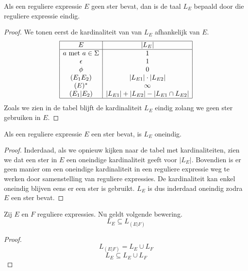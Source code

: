 \documentclass[main.tex]{subfiles}
\begin{document}
\begin{st}
  Als een reguliere expressie $E$ geen ster bevat, dan is de taal $L_{E}$ bepaald door die reguliere expressie eindig.
  
  \begin{proof}
    We tonen eerst de kardinaliteit van van $L_{E}$ afhankelijk van $E$.
    \[
    \begin{array}{|c|c|}
      \hline
      E                           & |L_E|\\
      \hline
      a \text{ met } a \in \Sigma & 1\\
      \epsilon                    & 1\\
      \phi                        & 0\\
      (E_1E_2)                    & |L_{E1}| \cdot |L_{E2}|\\
      (E)^{*}                      & \infty\\
      (E_1|E_2)                   & |L_{E1}| + |L_{E2}| - |L_{E1} \cap L_{E2}|\\
      \hline
    \end{array}
    \]
    Zoals we zien in de tabel blijft de kardinaliteit $L_{E}$ eindig zolang we geen ster gebruiken in $E$.
  \end{proof}
\end{st}

\begin{st}
  Als een reguliere expressie $E$ een ster bevat, is $L_{E}$ oneindig.
  \begin{proof}
    Inderdaad, als we opnieuw kijken naar de tabel met kardinaliteiten, zien we dat een ster in $E$ een oneindige kardinaliteit geeft voor $|L_{E}|$.
    Bovendien is er geen manier om een oneindige kardinaliteit in een reguliere expressie weg te werken door samenstelling van reguliere expressies.
    De kardinaliteit kan enkel oneindig blijven eens er een ster is gebruikt.
    $L_{E}$ is dus inderdaad oneindig zodra $E$ een ster bevat.
  \end{proof}
\end{st}

\begin{st}
  Zij $E$ en $F$ reguliere expressies. Nu geldt volgende bewering.
  \[ L_{E} \subseteq L_{(E|F)} \]

  \begin{proof}
    \[ L_{(E|F)} = L_{E} \cup L_{F}\]
    \[ L_{E} \subseteq L_{E} \cup L_{F} \]
  \end{proof}
\end{st}
\end{document}
